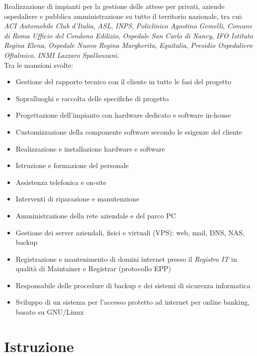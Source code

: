         {Realizzazione di impianti per la gestione delle attese per privati, aziende ospedaliere e pubblica 
          amministrazione su tutto il territorio nazionale, tra cui: \emph{ACI Automobile Club d'Italia}, \emph{ASL}, \emph{INPS}, \emph{Policlinico Agostino Gemelli}, \emph{Comune di Roma Ufficio del Condono Edilizio}, \emph{Ospedale San Carlo di Nancy}, \emph{IFO Istituto Regina Elena}, \emph{Ospedale Nuovo Regina Margherita}, \emph{Equitalia}, \emph{Presidio Ospedaliero Oftalmico}, \emph{INMI Lazzaro Spallanzani}.\\Tra le mansioni svolte:
          \begin{itemize}
          \item Gestione del rapporto tecnico con il cliente in tutte le fasi del progetto
          \item Sopralluoghi e raccolta delle specifiche di progetto
          \item Progettazione dell'impianto con hardware dedicato e software in-house
          \item Customizzazione della componente software secondo le esigenze del cliente
          \item Realizzazione e installazione hardware e software
          \item Istruzione e formazione del personale
          \item Assistenza telefonica e on-site
          \item Interventi di riparazione e manutenzione
          \end{itemize}}
\vspace{3mm}
        {\begin{itemize}
          \item Amministrazione della rete aziendale e del parco PC
          \item Gestione dei server aziendali, fisici e virtuali (VPS): web, mail, DNS, NAS, backup
          \item Registrazione e mantenimento di domini internet presso il \emph{Registro IT} in qualità di Maintainer e Registrar (protocollo EPP)
          \item Responsabile delle procedure di backup e dei sistemi di sicurezza informatica
          \item Sviluppo di un sistema per l'accesso protetto ad internet per online banking, basato su GNU/Linux
        \end{itemize}}
\section{Istruzione}
